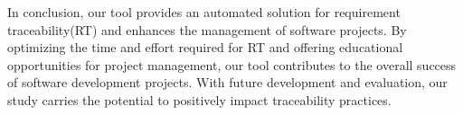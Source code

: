 \documentclass[conference]{IEEEtran}
\begin{document}
In conclusion, our tool provides an automated solution for requirement traceability(RT) and enhances the management of software projects. By optimizing the time and effort required for RT and offering educational opportunities for project management, our tool contributes to the overall success of software development projects. With future development and evaluation, our study carries the potential to positively impact traceability practices.




\end{document}
